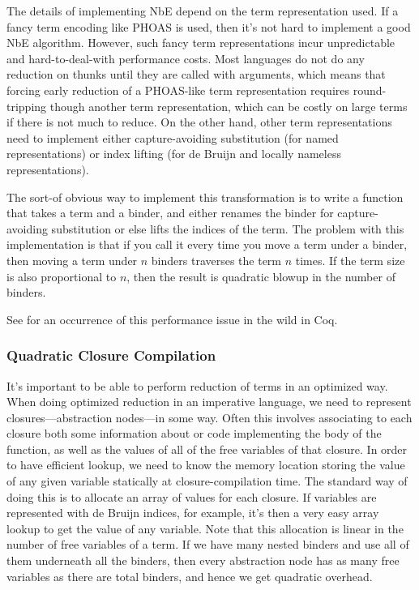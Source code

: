 The details of implementing NbE depend on the term representation used.
If a fancy term encoding like PHOAS  is used, then it's not hard to implement a good NbE algorithm.
However, such fancy term representations incur unpredictable and hard-to-deal-with performance costs.
Most languages do not do any reduction on thunks until they are called with arguments, which means that forcing early reduction of a PHOAS-like term representation requires round-tripping though another term representation, which can be costly on large terms if there is not much to reduce.
On the other hand, other term representations need to implement either capture-avoiding substitution (for named representations) or index lifting (for de Bruijn and locally nameless representations).

The sort-of obvious way to implement this transformation is to write a function that takes a term and a binder, and either renames the binder for capture-avoiding substitution or else lifts the indices of the term.
The problem with this implementation is that if you call it every time you move a term under a binder, then moving a term under $n$ binders traverses the term $n$ times.
If the term size is also proportional to $n$, then the result is quadratic blowup in the number of binders.

See  for an occurrence of this performance issue in the wild in Coq.

\subsubsection{Quadratic Closure Compilation} \label{sec:perf:closure-compilation} \label{sec:perf:quadratic-vm-native}
It's important to be able to perform reduction of terms in an optimized way.
When doing optimized reduction in an imperative language, we need to represent closures---abstraction nodes---in some way.
Often this involves associating to each closure both some information about or code implementing the body of the function, as well as the values of all of the free variables of that closure.
In order to have efficient lookup, we need to know the memory location storing the value of any given variable statically at closure-compilation time.
The standard way of doing this  is to allocate an array of values for each closure.
If variables are represented with de Bruijn indices, for example, it's then a very easy array lookup to get the value of any variable.
Note that this allocation is linear in the number of free variables of a term.
If we have many nested binders and use all of them underneath all the binders, then every abstraction node has as many free variables as there are total binders, and hence we get quadratic overhead.

